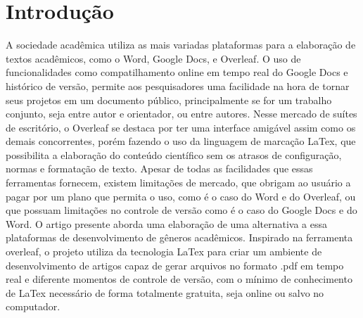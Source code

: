 \section{Introdução}

A sociedade acadêmica utiliza as mais variadas plataformas para a elaboração de textos acadêmicos, como o Word, Google Docs, e Overleaf. O uso de funcionalidades como compatilhamento online em tempo real do Google Docs e histórico de versão, permite aos pesquisadores uma facilidade na hora de tornar seus projetos em um documento público, principalmente se for um trabalho conjunto, seja entre autor e orientador, ou entre autores.
Nesse mercado de suítes de escritório, o Overleaf se destaca por ter uma interface amigável assim como os demais concorrentes, porém fazendo o uso da linguagem de marcação LaTex, que possibilita a elaboração do conteúdo científico sem os atrasos de configuração, normas e formatação de texto.
Apesar de todas as facilidades que essas ferramentas fornecem, existem limitações de mercado, que obrigam ao usuário a pagar por um plano que permita o uso, como é o caso do Word e do Overleaf, ou que possuam limitações no controle de versão como é o caso do Google Docs e do Word.
O artigo presente aborda uma elaboração de uma alternativa a essa plataformas de desenvolvimento de gêneros acadêmicos. Inspirado na ferramenta overleaf, o projeto utiliza da tecnologia LaTex para criar um ambiente de desenvolvimento de artigos capaz de gerar arquivos no formato .pdf em tempo real e diferente momentos de controle de versão, com o mínimo de conhecimento de LaTex necessário de forma totalmente gratuita, seja online ou salvo no computador.